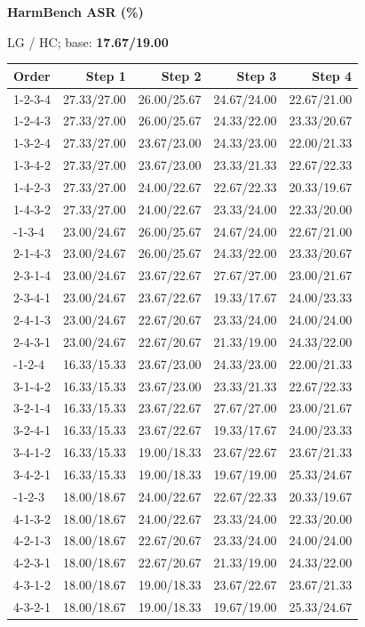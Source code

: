 \begin{minipage}[t]{0.33\linewidth}
\centering
{\bfseries HarmBench ASR (\%)}\par
{\small LG / HC; base: \textbf{17.67/19.00}}\par\vspace{5pt}
\small\setlength{\tabcolsep}{3.5pt}\renewcommand{\arraystretch}{1.19}
\begin{tabular}{@{}lrrrr@{}}
\toprule Order & Step 1 & Step 2 & Step 3 & Step 4 \\
\midrule
1-2-3-4 & 27.33/27.00 & 26.00/25.67 & 24.67/24.00 & 22.67/21.00 \\
1-2-4-3 & 27.33/27.00 & 26.00/25.67 & 24.33/22.00 & 23.33/20.67 \\
1-3-2-4 & 27.33/27.00 & 23.67/23.00 & 24.33/23.00 & 22.00/21.33 \\
1-3-4-2 & 27.33/27.00 & 23.67/23.00 & 23.33/21.33 & 22.67/22.33 \\
1-4-2-3 & 27.33/27.00 & 24.00/22.67 & 22.67/22.33 & 20.33/19.67 \\
1-4-3-2 & 27.33/27.00 & 24.00/22.67 & 23.33/24.00 & 22.33/20.00 \\
\addlinespace[3pt]
2-1-3-4 & 23.00/24.67 & 26.00/25.67 & 24.67/24.00 & 22.67/21.00 \\
2-1-4-3 & 23.00/24.67 & 26.00/25.67 & 24.33/22.00 & 23.33/20.67 \\
2-3-1-4 & 23.00/24.67 & 23.67/22.67 & 27.67/27.00 & 23.00/21.67 \\
2-3-4-1 & 23.00/24.67 & 23.67/22.67 & 19.33/17.67 & 24.00/23.33 \\
2-4-1-3 & 23.00/24.67 & 22.67/20.67 & 23.33/24.00 & 24.00/24.00 \\
2-4-3-1 & 23.00/24.67 & 22.67/20.67 & 21.33/19.00 & 24.33/22.00 \\
\addlinespace[3pt]
3-1-2-4 & 16.33/15.33 & 23.67/23.00 & 24.33/23.00 & 22.00/21.33 \\
3-1-4-2 & 16.33/15.33 & 23.67/23.00 & 23.33/21.33 & 22.67/22.33 \\
3-2-1-4 & 16.33/15.33 & 23.67/22.67 & 27.67/27.00 & 23.00/21.67 \\
3-2-4-1 & 16.33/15.33 & 23.67/22.67 & 19.33/17.67 & 24.00/23.33 \\
3-4-1-2 & 16.33/15.33 & 19.00/18.33 & 23.67/22.67 & 23.67/21.33 \\
3-4-2-1 & 16.33/15.33 & 19.00/18.33 & 19.67/19.00 & 25.33/24.67 \\
\addlinespace[3pt]
4-1-2-3 & 18.00/18.67 & 24.00/22.67 & 22.67/22.33 & 20.33/19.67 \\
4-1-3-2 & 18.00/18.67 & 24.00/22.67 & 23.33/24.00 & 22.33/20.00 \\
4-2-1-3 & 18.00/18.67 & 22.67/20.67 & 23.33/24.00 & 24.00/24.00 \\
4-2-3-1 & 18.00/18.67 & 22.67/20.67 & 21.33/19.00 & 24.33/22.00 \\
4-3-1-2 & 18.00/18.67 & 19.00/18.33 & 23.67/22.67 & 23.67/21.33 \\
4-3-2-1 & 18.00/18.67 & 19.00/18.33 & 19.67/19.00 & 25.33/24.67 \\
\bottomrule
\end{tabular}
\end{minipage}
